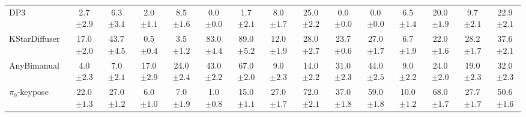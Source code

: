 \begin{table}[ht]
{\begin{tabular}{l|cc|cc|cc|cc|cc|cc|cc}
    DP3~\cite{ze20243d}  & 2.7\textcolor[gray]{0.5}{\small{$\pm2.9$}} & 6.3\textcolor[gray]{0.5}{\small{$\pm3.1$}} & 2.0\textcolor[gray]{0.5}{\small{$\pm1.1$}} & 8.5\textcolor[gray]{0.5}{\small{$\pm1.6$}} & 0.0\textcolor[gray]{0.5}{\small{$\pm0.0$}} & 1.7\textcolor[gray]{0.5}{\small{$\pm2.1$}} & 8.0\textcolor[gray]{0.5}{\small{$\pm1.7$}} & 25.0\textcolor[gray]{0.5}{\small{$\pm2.2$}} & 0.0\textcolor[gray]{0.5}{\small{$\pm0.0$}} & 0.0\textcolor[gray]{0.5}{\small{$\pm0.0$}} & 6.5\textcolor[gray]{0.5}{\small{$\pm1.4$}} & 20.0\textcolor[gray]{0.5}{\small{$\pm1.9$}} & 9.7\textcolor[gray]{0.5}{\small{$\pm2.1$}} & 22.9\textcolor[gray]{0.5}{\small{$\pm2.1$}} \\
    KStarDiffuser~\cite{lv2025spatial} & 17.0\textcolor[gray]{0.5}{\small{$\pm2.0$}} & 43.7\textcolor[gray]{0.5}{\small{$\pm4.5$}} & 0.5\textcolor[gray]{0.5}{\small{$\pm0.4$}} & 3.5\textcolor[gray]{0.5}{\small{$\pm1.2$}} & 83.0\textcolor[gray]{0.5}{\small{$\pm4.4$}} & 89.0\textcolor[gray]{0.5}{\small{$\pm5.2$}} & 12.0\textcolor[gray]{0.5}{\small{$\pm1.9$}} & 28.0\textcolor[gray]{0.5}{\small{$\pm2.7$}} & 23.7\textcolor[gray]{0.5}{\small{$\pm0.6$}} & 27.0\textcolor[gray]{0.5}{\small{$\pm1.7$}} & 6.7\textcolor[gray]{0.5}{\small{$\pm1.9$}} & 22.0\textcolor[gray]{0.5}{\small{$\pm1.6$}} & 28.2\textcolor[gray]{0.5}{\small{$\pm1.7$}} & 37.6\textcolor[gray]{0.5}{\small{$\pm2.1$}} \\
    AnyBimanual~\cite{lu2025anybimanual} & 4.0\textcolor[gray]{0.5}{\small{$\pm2.3$}} & 7.0\textcolor[gray]{0.5}{\small{$\pm2.1$}} & 17.0\textcolor[gray]{0.5}{\small{$\pm2.9$}} & 24.0\textcolor[gray]{0.5}{\small{$\pm2.4$}} & 43.0\textcolor[gray]{0.5}{\small{$\pm2.2$}} & 67.0\textcolor[gray]{0.5}{\small{$\pm2.0$}} & 9.0\textcolor[gray]{0.5}{\small{$\pm2.3$}} & 14.0\textcolor[gray]{0.5}{\small{$\pm2.2$}} & 31.0\textcolor[gray]{0.5}{\small{$\pm2.3$}} & 44.0\textcolor[gray]{0.5}{\small{$\pm2.5$}} & 9.0\textcolor[gray]{0.5}{\small{$\pm2.2$}} & 24.0\textcolor[gray]{0.5}{\small{$\pm2.0$}} & 19.0\textcolor[gray]{0.5}{\small{$\pm2.3$}} & 32.0\textcolor[gray]{0.5}{\small{$\pm2.3$}} \\
    $\pi_0$-keypose~\cite{black2410pi0} & 22.0\textcolor[gray]{0.5}{\small{$\pm1.3$}} & 27.0\textcolor[gray]{0.5}{\small{$\pm1.2$}} & 6.0\textcolor[gray]{0.5}{\small{$\pm1.0$}} & 7.0\textcolor[gray]{0.5}{\small{$\pm1.9$}} & 1.0\textcolor[gray]{0.5}{\small{$\pm0.8$}} & 15.0\textcolor[gray]{0.5}{\small{$\pm1.1$}} & 27.0\textcolor[gray]{0.5}{\small{$\pm1.7$}} & 72.0\textcolor[gray]{0.5}{\small{$\pm2.1$}} & 37.0\textcolor[gray]{0.5}{\small{$\pm1.8$}} & 59.0\textcolor[gray]{0.5}{\small{$\pm1.8$}} & 10.0\textcolor[gray]{0.5}{\small{$\pm1.2$}} & 68.0\textcolor[gray]{0.5}{\small{$\pm1.7$}} & 27.7\textcolor[gray]{0.5}{\small{$\pm1.7$}} & 50.6\textcolor[gray]{0.5}{\small{$\pm1.6$}} \\

\end{tabular}}
\end{table}
